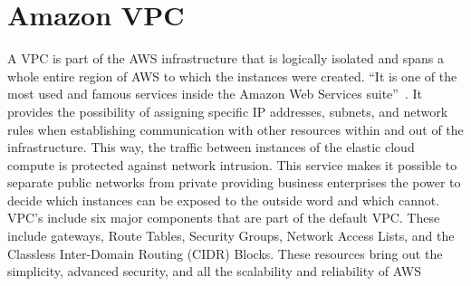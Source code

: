 \section{Amazon VPC}

A VPC is part of the AWS infrastructure that is logically isolated and spans a whole entire region of AWS to which the instances were created. ``It is one of the most used and famous services inside the Amazon Web Services suite''~\cite{hid-sp18-512-amazon-vpc-a}. It provides the possibility of assigning specific IP addresses, subnets, and network rules when establishing communication with other resources within and out of the infrastructure. This way, the traffic between instances of the elastic cloud compute is protected against network intrusion. This service makes it possible to separate public networks from private providing business enterprises the power to decide which instances can be exposed to the outside word and which cannot. VPC's include six major components that are part of the default VPC. These include gateways, Route Tables, Security Groups, Network Access Lists, and the Classless Inter-Domain Routing (CIDR) Blocks. These resources bring out the simplicity, advanced security, and all the scalability and reliability of AWS~\cite{hid-sp18-512-amazon-vpc}
